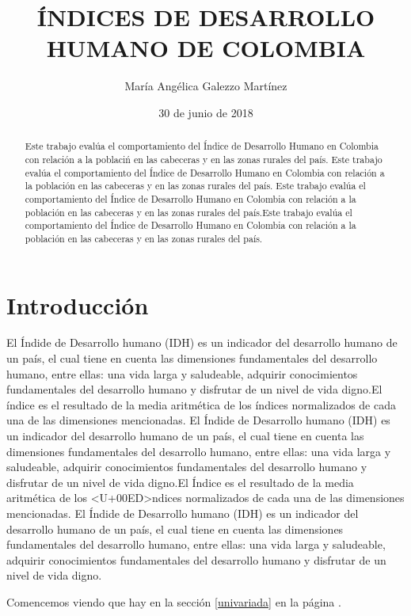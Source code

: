 \documentclass{article}
\title{\'INDICES DE DESARROLLO HUMANO DE COLOMBIA}
\author[1]{\normalsize Mar\'ia Ang\'elica Galezzo Mart\'inez}
\affil[1]{\small  Escuela de Ingenier\'ia,Universidad de los Andes\\
\texttt{{ma.galezzo}@uniandes.edu.co}}
\date{30 de junio de 2018}
\begin{document}


\maketitle

\begin{abstract}
Este trabajo eval\'ua el comportamiento del \'Indice de Desarrollo Humano en Colombia con relaci\'on a la poblaci\'n en las cabeceras y en las zonas rurales del pa\'is. Este trabajo eval\'ua el comportamiento del \'Indice de Desarrollo Humano en Colombia con relaci\'on a la poblaci\'on en las cabeceras y en las zonas rurales del pa\'is. Este trabajo eval\'ua el comportamiento del \'Indice de Desarrollo Humano en Colombia con relaci\'on a la poblaci\'on en las cabeceras y en las zonas rurales del pa\'is.Este trabajo eval\'ua el comportamiento del \'Indice de Desarrollo Humano en Colombia con relaci\'on a la poblaci\'on en las cabeceras y en las zonas rurales del pa\'is.
\end{abstract}

\section*{Introducci\'on}

El \'Indide de Desarrollo humano (IDH) es un indicador del desarrollo humano de un pa\'is, el cual tiene en cuenta las dimensiones fundamentales del desarrollo humano, entre ellas: una vida larga y saludeable, adquirir conocimientos fundamentales del desarrollo humano y disfrutar de un nivel de vida digno.El \'indice es el resultado de la media aritm\'etica de los \'indices normalizados de cada una de las dimensiones mencionadas. El \'Indide de Desarrollo humano (IDH) es un indicador del desarrollo humano de un pa\'is, el cual tiene en cuenta las dimensiones fundamentales del desarrollo humano, entre ellas: una vida larga y saludeable, adquirir conocimientos fundamentales del desarrollo humano y disfrutar de un nivel de vida digno.El \'Indice es el resultado de la media aritm\'etica de los <U+00ED>ndices normalizados de cada una de las dimensiones mencionadas. El \'Indide de Desarrollo humano (IDH) es un indicador del desarrollo humano de un pa\'is, el cual tiene en cuenta las dimensiones fundamentales del desarrollo humano, entre ellas: una vida larga y saludeable, adquirir conocimientos fundamentales del desarrollo humano y disfrutar de un nivel de vida digno. 

Comencemos viendo que hay en la secci\'on \ref{univariada} en la p\'agina \pageref{univariada}.
\end{document}
